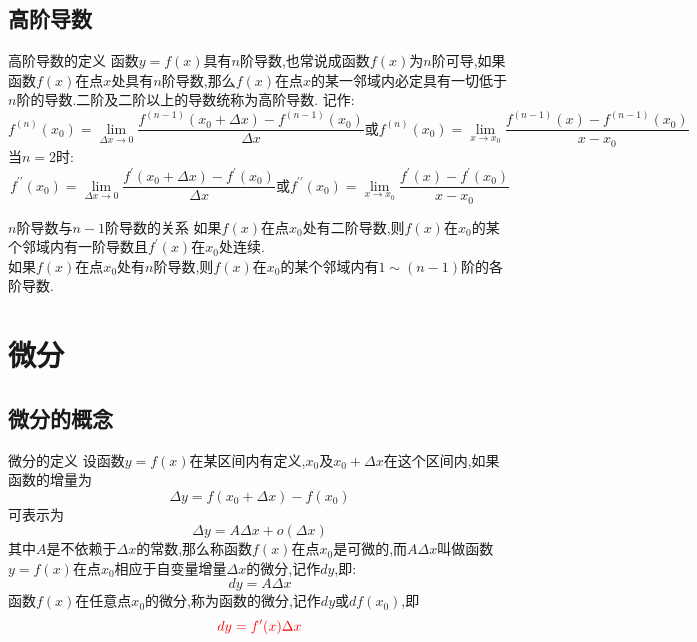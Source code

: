 \documentclass[8pt a4paper, oneside, UTF8]{ctexbook}  %
\begin{document}
\begin{sloppypar}
    \subsection{高阶导数}
    \begin{defn}{高阶导数的定义}{}
        函数$y=f(x)$具有$n$阶导数,也常说成函数$f(x)$为$n$阶可导,如果函数$f(x)$在点$x$处具有$n$阶导数,那么$f(x)$在点$x$的某一邻域内必定具有一切低于$n$阶的导数.二阶及二阶以上的导数统称为高阶导数.
        记作:
        $$
        f^{(n)}(x_0)=\lim_{\Delta x\to0}\dfrac{f^{(n-1)}(x_0+\Delta x)-f^{(n-1)}(x_0)}{\Delta x}\text{或}f^{(n)}(x_0)=\lim_{x\to x_0}\dfrac{f^{(n-1)}(x)-f^{(n-1)}(x_0)}{x-x_0}
        $$
        当$n=2$时:
        $$
        f^{\prime\prime}(x_0)=\lim_{\Delta x\to0}\dfrac{f^{\prime}(x_0+\Delta x)-f^{\prime}(x_0)}{\Delta x}\text{或}f^{\prime\prime}(x_0)=\lim_{x\to x_0}\dfrac{f^{\prime}(x)-f^{\prime}(x_0)}{x-x_0}
        $$
    \end{defn}
    \begin{criterion}{$n$阶导数与$n-1$阶导数的关系}{}
        如果$f(x)$在点$x_0$处有二阶导数,则$f(x)$在$x_0$的某个邻域内有一阶导数且$f^\prime(x)$在$x_0$处连续.\\
        如果$f(x)$在点$x_{0}$处有$n$阶导数,则$f(x)在x_0$的某个邻域内有$1 \sim (n-1)$阶的各阶导数.
    \end{criterion}
    \section{微分}
    \subsection{微分的概念}
    \begin{defn}{微分的定义}{}
        设函数$y=f(x)$在某区间内有定义,$x_0$及$x_0+\Delta x$在这个区间内,如果函数的增量为
        $$
            \Delta y=f(x_{0}+\Delta x)-f(x_{0})
        $$
        可表示为
        $$
            \Delta y=A\Delta x+o(\Delta x)
        $$
        其中$A$是不依赖于$\Delta x$的常数,那么称函数$f(x)$在点$x_0$是可微的,而$A\Delta x$叫做函数$y=f(x)$在点$x_0$相应于自变量增量$\Delta x$​的微分,记作$dy$,即:
        $$
            dy=A\Delta x
        $$
        函数$f(x)$在任意点$x_0$的微分,称为函数的微分,记作$dy$或$df(x_0)$,即
        $$
            \textcolor{red}{dy=f^{\prime}(x)\Delta x}
        $$
    \end{defn}

\end{sloppypar}
\end{document}
